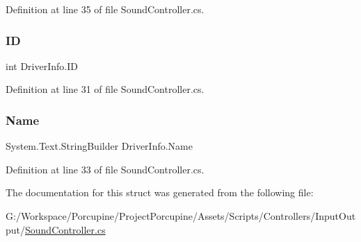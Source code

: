 Definition at line 35 of file Sound\+Controller.\+cs.

\mbox{\label{struct_driver_info_a89242d1b1bff9e67bfc924bfddbecae8}} 
\subsubsection{\texorpdfstring{ID}{ID}}
{\footnotesize\ttfamily int Driver\+Info.\+ID\hspace{0.3cm}{\ttfamily [get]}}



Definition at line 31 of file Sound\+Controller.\+cs.

\mbox{\label{struct_driver_info_a1d9ed2dced2e3d836bd6f92cf3bd3e25}} 
\subsubsection{\texorpdfstring{Name}{Name}}
{\footnotesize\ttfamily System.\+Text.\+String\+Builder Driver\+Info.\+Name\hspace{0.3cm}{\ttfamily [get]}}



Definition at line 33 of file Sound\+Controller.\+cs.



The documentation for this struct was generated from the following file\+:\begin{DoxyCompactItemize}
\item 
G\+:/\+Workspace/\+Porcupine/\+Project\+Porcupine/\+Assets/\+Scripts/\+Controllers/\+Input\+Output/\hyperlink{_sound_controller_8cs}{Sound\+Controller.\+cs}\end{DoxyCompactItemize}
